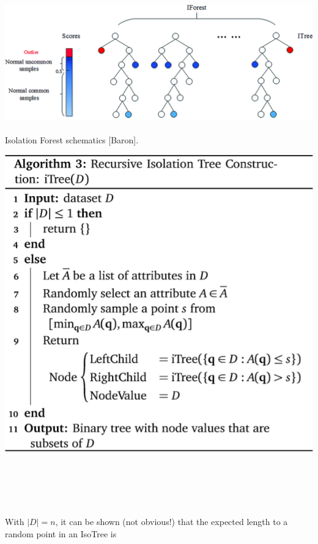 \documentclass[20pt,landscape,footrule,headrule]{foils}
\begin{document}
{{\begin{center}
\includegraphics[width=\textwidth]{Images/iForest.png} \\ \ \\
Isolation Forest schematics [Baron].
\end{center}
\newpage
\begin{center}\includegraphics[height=\textheight]{Images/Algorithm3}
\end{center}
\newpage\ \begin{center}
\end{center}
\newpage\ \begin{center}
\end{center}
\newpage\ \\ \noindent 
With $|D|=n$, it can be shown (not obvious!) that the expected length to a random point in an IsoTree is 
}}
\end{document}
